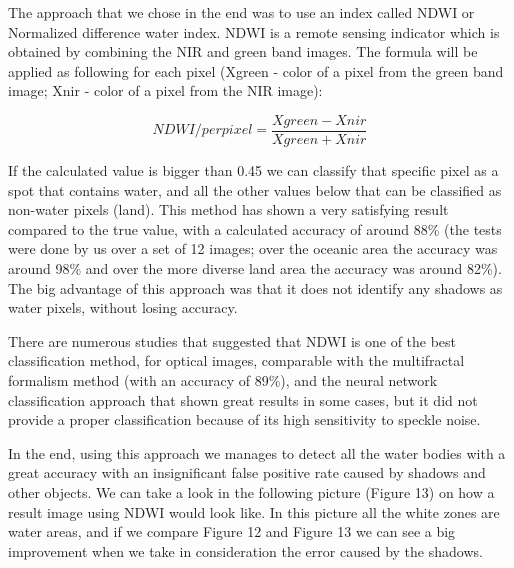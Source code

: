 \documentclass[12pt, a4paper]{report}
\begin{document}
The approach that we chose in the end was to use an index called NDWI or Normalized difference water index. NDWI is a remote sensing indicator which is obtained by combining the NIR and green band images. The formula will be applied as following for each pixel (Xgreen - color of a pixel from the green band image; Xnir - color of a pixel from the NIR image):

$$ NDWI/perpixel = \frac{Xgreen - Xnir}{Xgreen + Xnir}$$

If the calculated value is bigger than 0.45 we can classify that specific pixel as a spot that contains water, and all the other values below that can be classified as non-water pixels (land). This method has shown a very satisfying result compared to the true value, with a calculated accuracy of around 88\% (the tests were done by us over a set of 12 images; over the oceanic area the accuracy was around 98\% and over the more diverse land area the accuracy was around 82\%). The big advantage of this approach was that it does not identify any shadows as water pixels, without losing accuracy. 
\par 
There are numerous studies \cite{NDWI, NDWI Comparison} that suggested that NDWI is one of the best classification method, for optical images, comparable with the multifractal formalism method (with an accuracy of 89\%), and the neural network classification approach that shown great results in some cases, but it did not provide a proper classification because of its high sensitivity to speckle noise.
\par 

In the end, using this approach we manages to detect all the water bodies with a great accuracy with an insignificant false positive rate caused by shadows and other objects. We can take a look in the following picture (Figure 13) on how a result image using NDWI would look like. In this picture all the white zones are water areas, and if we compare Figure 12 and Figure 13 we can see a big improvement when we take in consideration the error caused by the shadows.
\par 
\end{document}
